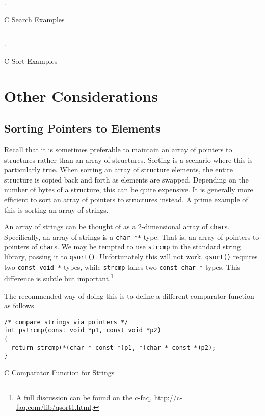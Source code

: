 \begin{listing}[H]
\inputminted[fontsize=\scriptsize]{c}{code/searchDemo.c}.
\caption{C Search Examples}
\label{code:c:searchExamples}
\end{listing}

\begin{listing}[H]
\inputminted[]{c}{code/sortDemo.c}.
\caption{C Sort Examples}
\label{code:c:sortExamples}
\end{listing}

\section{Other Considerations}

\subsection{Sorting Pointers to Elements}

Recall that it is sometimes preferable to maintain an array of pointers
to structures rather than an array of structures.  Sorting is a scenario
where this is particularly true.  When sorting an array of structure
elements, the entire structure is copied back and forth as elements
are swapped.  Depending on the number of bytes of a structure, this can
be quite expensive.  It is generally more efficient to sort an array of 
pointers to structures instead.  A prime example of this is sorting an
array of strings.

An array of strings can be thought of as a 2-dimensional array of 
\texttt{char}s.  Specifically, an array of strings is a 
\texttt{char **} type.  That is, an array of pointers to 
pointers of \texttt{char}s.  We may be tempted to use 
\texttt{strcmp} in the standard string library, passing it 
to \texttt{qsort()}.  
Unfortunately this will not work.  \texttt{qsort()} requires 
two \texttt{const void *} types, while \texttt{strcmp} 
takes two \texttt{const char *} types.  This difference is 
subtle but important.\footnote{A full discussion can be found on the 
c-faq, \url{http://c-faq.com/lib/qsort1.html}.}

The recommended way of doing this is to define a different comparator 
function as follows.

\begin{listing}[H]
\begin{verbatim}
/* compare strings via pointers */
int pstrcmp(const void *p1, const void *p2)
{
  return strcmp(*(char * const *)p1, *(char * const *)p2);
}
\end{verbatim}
\caption{C Comparator Function for Strings}
\end{listing}

